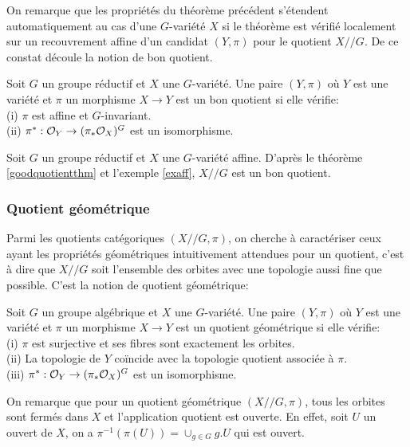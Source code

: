 On remarque que les propriétés du théorème précédent s'étendent automatiquement au cas d'une $G$-variété $X$ si le théorème est vérifié localement sur un recouvrement affine d'un candidat $(Y,\pi)$ pour le quotient $X//G$. De ce constat découle la notion de bon quotient.

\begin{defn}
Soit $G$ un groupe réductif et $X$ une $G$-variété. Une paire $(Y, \pi)$ où $Y$ est une variété et $\pi$ un morphisme $X\rightarrow Y$ est un bon quotient si elle vérifie:\\
(i) $\pi$ est affine et $G$-invariant.\\
(ii) $\pi^*:\mathcal{O}_Y \rightarrow (\pi_*\mathcal{O}_X)^G$ est un isomorphisme.
\end{defn}

\begin{ex}
Soit $G$ un groupe réductif et $X$ une $G$-variété affine. D'après le théorème \ref{goodquotientthm} et l'exemple \ref{exaff}, $X//G$ est un bon quotient.
\end{ex}


\subsubsection{Quotient géométrique}

Parmi les quotients catégoriques $(X//G,\pi)$, on cherche à caractériser ceux ayant les propriétés géométriques intuitivement attendues pour un quotient, c'est à dire que $X//G$ soit l'ensemble des orbites avec une topologie aussi fine que possible. C'est la notion de quotient géométrique:

\begin{defn}
Soit $G$ un groupe algébrique et $X$ une $G$-variété. Une paire $(Y, \pi)$ où $Y$ est une variété et $\pi$ un morphisme $X\rightarrow Y$ est un quotient géométrique si elle vérifie:\\
(i) $\pi$ est surjective et ses fibres sont exactement les orbites.\\
(ii) La topologie de $Y$ coïncide avec la topologie quotient associée à $\pi$.\\
(iii) $\pi^*:\mathcal{O}_Y \rightarrow (\pi_*\mathcal{O}_X)^G$ est un isomorphisme.
\end{defn}

On remarque que pour un quotient géométrique $(X//G, \pi)$, tous les orbites sont fermés dans $X$ et l'application quotient est ouverte. En effet, soit $U$ un ouvert de $X$, on a $\pi^{-1}(\pi(U))=\cup_{g\in G}g.U$ qui est ouvert.

